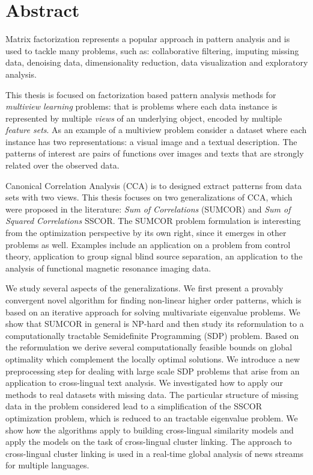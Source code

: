 %
\chapter*{Abstract}

Matrix factorization represents a popular approach in pattern analysis and
is used to tackle many problems, such as: collaborative filtering, imputing
missing data, denoising data, dimensionality reduction, data visualization and
exploratory analysis.

This thesis is focused on factorization based pattern analysis methods
for \emph{multiview learning} problems:
that is problems where each data instance is represented by multiple \emph{views} of an underlying
object, encoded by multiple \emph{feature sets}.
As an example of a multiview problem consider a dataset where each instance has two representations: a visual
image and a textual description. The patterns of interest are pairs of functions over images and texts
that are strongly related over the observed data.

Canonical Correlation Analysis (CCA) is to designed extract patterns from data sets
with two views. This thesis focuses on two generalizations of CCA, which were proposed
in the literature: \emph{Sum of Correlations} (SUMCOR) and \emph{Sum of Squared Correlations} SSCOR.
The SUMCOR problem formulation is interesting from the optimization perspective by its own right,
since it emerges in other problems as well. Examples include an application on a problem
from control theory, application to group signal blind source separation,
an application to the analysis of functional magnetic resonance imaging data.

We study several aspects of the generalizations. We first present a provably convergent novel algorithm
for finding non-linear higher order patterns, which is based on an iterative approach for solving
multivariate eigenvalue problems. We show that SUMCOR in general is NP-hard and then study
its reformulation to a computationally tractable Semidefinite Programming (SDP) problem. Based
on the reformulation we derive several computationally feasible bounds on global optimality
which complement the locally optimal solutions. We introduce a new preprocessing step
for dealing with large scale SDP problems that arise from an application to cross-lingual
text analysis. We investigated how to apply our methods to real datasets with missing data.
The particular structure of missing data in the problem considered lead to a simplification of the SSCOR
optimization problem, which is reduced to an tractable eigenvalue problem. We show how
the algorithms apply to building cross-lingual similarity models and apply the models on the task
of cross-lingual cluster linking. The approach to cross-lingual cluster linking is used
in a real-time global analysis of news streams for multiple languages. 